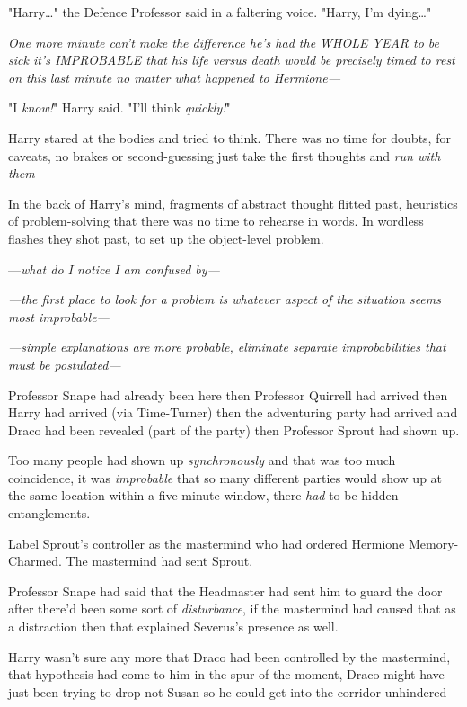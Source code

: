 "Harry…" the Defence Professor said in a faltering voice. "Harry, I'm
dying…"

\emph{One more minute can't make the difference he's had the WHOLE YEAR to be
sick it's IMPROBABLE that his life versus death would be precisely timed to
rest on this last minute no matter what happened to Hermione—}

"I \emph{know!}" Harry said. "I'll think \emph{quickly!}"

Harry stared at the bodies and tried to think. There was no time for doubts,
for caveats, no brakes or second-guessing just take the first thoughts and
\emph{run with them—}

In the back of Harry's mind, fragments of abstract thought flitted past,
heuristics of problem-solving that there was no time to rehearse in words. In
wordless flashes they shot past, to set up the object-level problem.

—\emph{what do I notice I am confused by—}

\emph{—the first place to look for a problem is whatever aspect of the
situation seems most improbable—}

\emph{—simple explanations are more probable, eliminate separate
improbabilities that must be postulated—}

Professor Snape had already been here then Professor Quirrell had arrived then
Harry had arrived (via Time-Turner) then the adventuring party had arrived and
Draco had been revealed (part of the party) then Professor Sprout had shown up.

Too many people had shown up \emph{synchronously} and that was too much
coincidence, it was \emph{improbable} that so many different parties would show
up at the same location within a five-minute window, there \emph{had} to be
hidden entanglements.

Label Sprout's controller as the mastermind who had ordered Hermione
Memory-Charmed. The mastermind had sent Sprout.

Professor Snape had said that the Headmaster had sent him to guard the door
after there'd been some sort of \emph{disturbance}, if the mastermind had
caused that as a distraction then that explained Severus's presence as well.

Harry wasn't sure any more that Draco had been controlled by the mastermind,
that hypothesis had come to him in the spur of the moment, Draco might have
just been trying to drop not-Susan so he could get into the corridor unhindered—

